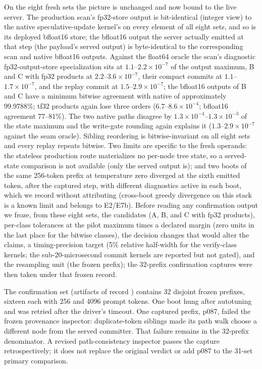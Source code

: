 \documentclass[conference]{IEEEtran}
\begin{document}
On the eight fresh sets the picture is unchanged and now bound to the live server. The production scan's fp32-store output is bit-identical (integer view) to the native speculative-update kernel's on every element of all eight sets, and so is its deployed bfloat16 store; the bfloat16 output the server actually emitted at that step (the payload's served output) is byte-identical to the corresponding scan and native bfloat16 outputs. Against the float64 oracle the scan's diagnostic fp32-output-store specialization sits at $1.1$--$2.2\times10^{-7}$ of the output maximum, B and C with fp32 products at $2.2$--$3.6\times10^{-7}$, their compact commits at $1.1$--$1.7\times10^{-7}$, and the replay commit at $1.5$--$2.9\times10^{-7}$; the bfloat16 outputs of B and C have a minimum bitwise agreement with native of approximately 99.9788\%; tf32 products again lose three orders ($6.7$--$8.6\times10^{-4}$; bfloat16 agreement 77--81\%). The two native paths disagree by $1.3\times10^{-4}$--$1.3\times10^{-3}$ of the state maximum and the write-gate rounding again explains it ($1.3$--$2.9\times10^{-7}$ against the seam oracle). Sibling reordering is bitwise-invariant on all eight sets and every replay repeats bitwise. Two limits are specific to the fresh operands: the stateless production route materializes no per-node tree state, so a served-state comparison is not available (only the served output is); and two boots of the same 256-token prefix at temperature zero diverged at the sixth emitted token, after the captured step, with different diagnostics active in each boot, which we record without attributing (cross-boot greedy divergence on this stack is a known limit and belongs to E2/E7b). Before reading any confirmation output we froze, from these eight sets, the candidates (A, B, and C with fp32 products), per-class tolerances at the pilot maximum times a declared margin (zero units in the last place for the bitwise classes), the decision changes that would alter the claims, a timing-precision target (5\% relative half-width for the verify-class kernels; the sub-20-microsecond commit kernels are reported but not gated), and the resampling unit (the frozen prefix); the 32-prefix confirmation captures were then taken under that frozen record.

The confirmation set (artifacts of record ) contains 32 disjoint frozen prefixes, sixteen each with 256 and 4096 prompt tokens. One boot hung after autotuning and was retried after the driver's timeout. One captured prefix, p087, failed the frozen provenance inspector: duplicate-token siblings made its path walk choose a different node from the served committer. That failure remains in the 32-prefix denominator. A revised path-consistency inspector passes the capture retrospectively; it does not replace the original verdict or add p087 to the 31-set primary comparison.
\end{document}
